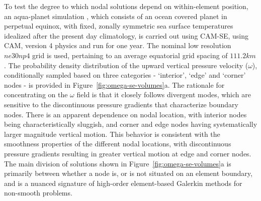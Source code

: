 \documentclass[twocol]{ametsoc}
\begin{document}
To test the degree to which nodal solutions depend on within-element position, an aqua-planet simulation \citep{NH2000ASL,MWO2016JAMES}, {\color{red}which consists of an ocean covered planet in perpetual equinox, with fixed, zonally symmetric sea surface temperatures idealized after the present day climatology,{}} is carried out using CAM-SE, using CAM, version 4 physics \citep[CAM4;][]{CAM4} and run for one year. The nominal low resolution $ne30np4$ grid is used, pertaining to an average equatorial grid spacing of $111.2km$. The probability density distribution of the upward vertical pressure velocity ($\omega$), conditionally sampled based on three categories - `interior', `edge' and `corner' nodes - is provided in Figure~\ref{fig:omega-se-volumes}{\color{red}a. The rationale for concentrating on the $\omega$ field is that it closely follows divergent modes, which are sensitive to the discontinuous pressure gradients that characterize boundary nodes.{}} There is an apparent dependence on nodal location, with interior nodes being characteristically sluggish, and corner and edge nodes having systematically larger magnitude vertical motion. This behavior is consistent with the smoothness properties of the different nodal locations, with discontinuous pressure gradients resulting in greater vertical motion at edge and corner nodes. The main division of solutions shown in Figure~\ref{fig:omega-se-volumes}{\color{red}a{}} is primarily between whether a node is, or is not situated on an element boundary, and is a nuanced signature of high-order element-based Galerkin methods for non-smooth problems.
\end{document}
